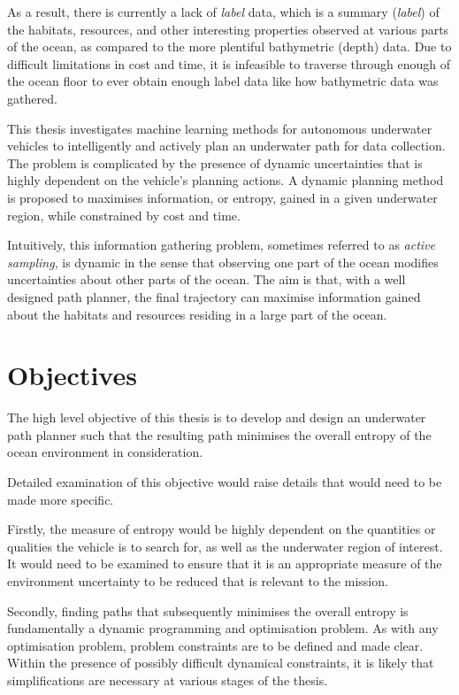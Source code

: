 		As a result, there is currently a lack of \textit{label} data, which is a summary (\textit{label}) of the habitats, resources, and other interesting properties observed at various parts of the ocean, as compared to the more plentiful bathymetric (depth) data. Due to difficult limitations in cost and time, it is infeasible to traverse through enough of the ocean floor to ever obtain enough label data like how bathymetric data was gathered.
		
		This thesis investigates machine learning methods for autonomous underwater vehicles to intelligently and actively plan an underwater path for data collection. The problem is complicated by the presence of dynamic uncertainties that is highly dependent on the vehicle's planning actions. A dynamic planning method is proposed to maximises information, or entropy, gained in a given underwater region, while constrained by cost and time.
	
		Intuitively, this information gathering problem, sometimes referred to as \textit{active sampling}, is dynamic in the sense that observing one part of the ocean modifies uncertainties about other parts of the ocean. The aim is that, with a well designed path planner, the final trajectory can maximise information gained about the habitats and resources residing in a large part of the ocean.
		
	\section{Objectives}

		The high level objective of this thesis is to develop and design an underwater path planner such that the resulting path minimises the overall entropy of the ocean environment in consideration.
		
		Detailed examination of this objective would raise details that would need to be made more specific.
		
		Firstly, the measure of entropy would be highly dependent on the quantities or qualities the vehicle is to search for, as well as the underwater region of interest. It would need to be examined to ensure that it is an appropriate measure of the environment uncertainty to be reduced that is relevant to the mission.
		
		Secondly, finding paths that subsequently minimises the overall entropy is fundamentally a dynamic programming and optimisation problem. As with any optimisation problem, problem constraints are to be defined and made clear. Within the presence of possibly difficult dynamical constraints, it is likely that simplifications are necessary at various stages of the thesis.
		
